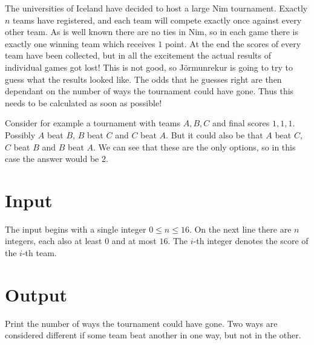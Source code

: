 
The universities of Iceland have decided to host a large
Nim tournament.
Exactly $n$ teams have registered, and each team will compete
exactly once against every other team.
As is well known there are no ties in Nim,
so in each game there is exactly one winning team which
receives $1$ point.
At the end the scores of every team have been collected,
but in all the excitement the actual results of individual
games got lost!
This is not good, so Jörmunrekur is going to try to guess
what the results looked like.
The odds that he guesses right are then dependant on the
number of ways the tournament could have gone.
Thus this needs to be calculated as soon as possible!

Consider for example a tournament with teams $A, B, C$
and final scores $1, 1, 1$.
Possibly $A$ beat $B$, $B$ beat $C$ and $C$ beat $A$.
But it could also be that $A$ beat $C$, $C$ beat $B$ and
$B$ beat $A$.
We can see that these are the only options, so in this case
the answer would be $2$.

\section*{Input}

The input begins with a single integer $0 \leq n \leq 16$.
On the next line there are $n$ integers, each also at least
$0$ and at most $16$.
The $i$-th integer denotes the score of the $i$-th team.

\section*{Output}

Print the number of ways the tournament could have gone.
Two ways are considered different if some team beat another
in one way, but not in the other.
